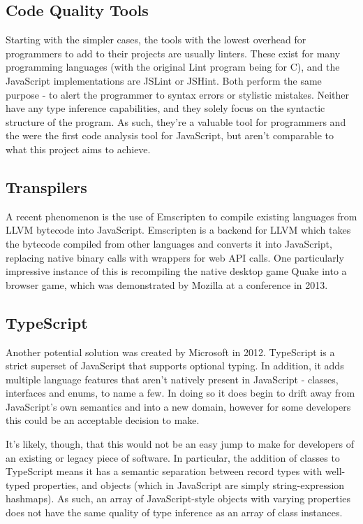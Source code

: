 \documentclass[british, twoside, openright]{bhamthesis}
\theoremstyle{definition}
\begin{document}
  \subsection{Code Quality Tools}

    Starting with the simpler cases, the tools with the lowest overhead for programmers to add to their projects are usually linters. These exist for many programming languages (with the original Lint program being for C), and the JavaScript implementations are JSLint or JSHint. Both perform the same purpose - to alert the programmer to syntax errors or stylistic mistakes. Neither have any type inference capabilities, and they solely focus on the syntactic structure of the program. As such, they're a valuable tool for programmers and the were the first code analysis tool for JavaScript, but aren't comparable to what this project aims to achieve.

  \subsection{Transpilers}

    A recent phenomenon is the use of Emscripten\autocite{Zakai} to compile existing languages from LLVM bytecode into JavaScript. Emscripten is a backend for LLVM which takes the bytecode compiled from other languages and converts it into JavaScript, replacing native binary calls with wrappers for web API calls. One particularly impressive instance of this is recompiling the native desktop game Quake into a browser game, which was demonstrated by Mozilla at a conference in 2013\autocite{unrealengine}.

  \subsection{TypeScript}

    Another potential solution was created by Microsoft in 2012. TypeScript is a strict superset of JavaScript that supports optional typing. In addition, it adds multiple language features that aren't natively present in JavaScript - classes, interfaces and enums, to name a few. In doing so it does begin to drift away from JavaScript's own semantics and into a new domain, however for some developers this could be an acceptable decision to make.

    It's likely, though, that this would not be an easy jump to make for developers of an existing or legacy piece of software. In particular, the addition of classes to TypeScript means it has a semantic separation between record types with well-typed properties, and objects (which in JavaScript are simply string-expression hashmaps). As such, an array of JavaScript-style objects with varying properties does not have the same quality of type inference as an array of class instances.
\end{document}
